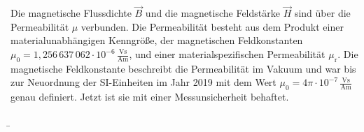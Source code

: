 \begin{frame}
{		Die magnetische Flussdichte $\vec{B}$ und die magnetische Feldstärke $\vec{H}$ sind über die Permeabilität $\mu$ verbunden. Die Permeabilität besteht aus dem Produkt einer materialunabhängigen Kenngröße, der magnetischen Feldkonstanten $\mu_0=1,256\,637\,062\cdot10^{-6}\,\frac{\mathrm{Vs}}{\mathrm{Am}}$, und einer materialspezifischen Permeabilität $\mu_{\mathrm{r}}$. Die magnetische Feldkonstante beschreibt die Permeabilität im Vakuum und war bis zur Neuordnung der SI-Einheiten im Jahr 2019 mit dem Wert $\mu_0 = 4\pi\cdot10^{-7}\,\frac{\mathrm{Vs}}{\mathrm{Am}}$ genau definiert. Jetzt ist sie mit einer Messunsicherheit behaftet.

	}
	\b{
		\begin{columns}
			\begin{column}{0.7\textwidth}
				\begin{minipage}{0.8\textwidth}
\end{minipage}
\end{column}
\end{columns}}
\end{frame}
